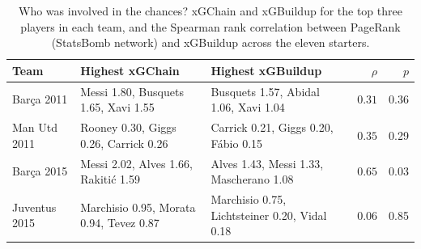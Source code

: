 \begin{table}[t]
\centering\small
\caption{Who was involved in the chances? xGChain and xGBuildup for the top three players in each team, and the Spearman rank correlation between PageRank (StatsBomb network) and xGBuildup across the eleven starters.}
\label{tab:chain}
\begin{tabularx}{\textwidth}{lXXrr}
\toprule
Team & Highest xGChain & Highest xGBuildup & $\rho$ & $p$ \\
\midrule
Barça 2011 & Messi 1.80, Busquets 1.65, Xavi 1.55 & Busquets 1.57, Abidal 1.06, Xavi 1.04 & $0.31$ & 0.36 \\
Man Utd 2011 & Rooney 0.30, Giggs 0.26, Carrick 0.26 & Carrick 0.21, Giggs 0.20, Fábio 0.15 & $0.35$ & 0.29 \\
Barça 2015 & Messi 2.02, Alves 1.66, Rakitić 1.59 & Alves 1.43, Messi 1.33, Mascherano 1.08 & $0.65$ & 0.03 \\
Juventus 2015 & Marchisio 0.95, Morata 0.94, Tevez 0.87 & Marchisio 0.75, Lichtsteiner 0.20, Vidal 0.18 & $0.06$ & 0.85 \\
\bottomrule
\end{tabularx}
\end{table}
